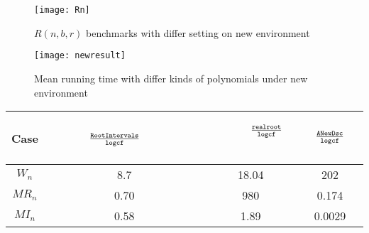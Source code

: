 \begin{figure}
	\begin{centering}
		\texttt{[image: Rn]}
		\caption{ $R(n,b,r)$ benchmarks  with differ setting on new environment\label{fig:2}}
	\end{centering}
\end{figure}



\begin{figure}
	\begin{centering}
		\texttt{[image: newresult]}
		\caption{ Mean running time with differ kinds of polynomials under new environment\label{fig:newresult}}
	\end{centering}
\end{figure}

\begin{table}
	\centering
	\label{tab:other}
	\begin{tabular}{|| c| c| c| c||}
		\hline
		
		\hline
		\scriptsize{Case}  &\ \  \ \ \ \ \scriptsize{$\frac{{\tt RootIntervals} }{{\tt logcf}}$}\ \  \ \ \ \ \  \ \   & \ \ \ \ \  \scriptsize{$\frac{{\tt realroot}}{{\tt logcf}}$} \ \ \ \ \  &\ \ \ \  \scriptsize{ $\frac{{\tt ANewDsc}}{{\tt logcf}}$ }  \ \ \ \   \\
		\hline
		$W_n$ & 8.7 & 18.04 &  202 \\
		\hline
		$MR_n$ & 0.70 & 980 & 0.174\\
		\hline
		$MI_n$ & 0.58 & 1.89&  0.0029  \\
		\hline
		
		\hline
	\end{tabular}%
\end{table}




